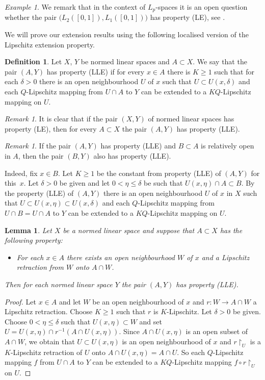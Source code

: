\documentclass[a4paper,twoside,10pt,reqno,draft]{amsart}
\let\comp=\circ
\let\wtilde=\widetilde
\newtheorem{lemma}[theorem]{Lemma}
\theoremstyle{definition}
\newtheorem{definition}[theorem]{Definition}
\theoremstyle{remark}
\newtheorem{remark}[theorem]{Remark}
\newtheorem{example}[theorem]{Example}
\newcommand\de{\delta}
\newcommand\restr[1]{\mathclose\restriction_{#1}}
\newcommand\pLLE{(LLE)}
\newcommand\pLE{(LE)}
\newcommand\pLLR{($\wtilde{\mathrm R}$)}
\begin{document}
\begin{example}
We remark that in the context of $L_p$-spaces it is an open question whether the pair $\bigl(L_2([0,1]),L_1([0,1])\bigr)$ has property \pLE, see \cite{NPSS}.
\end{example}

We will prove our extension results using the following localised version of the Lipschitz extension property.

\begin{definition}
Let $X$, $Y$ be normed linear spaces and $A\subset X$.
We say that the pair $(A,Y)$ has property {\pLLE} if for every $x\in A$ there is $K\ge1$ such that for each $\de>0$ there is an open neighbourhood $U$ of $x$ such that $U\subset U(x,\de)$
and each $Q$-Lipschitz mapping from $U\cap A$ to $Y$ can be extended to a $KQ$-Lipschitz mapping on $U$.
\end{definition}

\begin{remark}\label{r:LLE_prop}
It is clear that if the pair $(X,Y)$ of normed linear spaces has property {\pLE}, then for every $A\subset X$ the pair $(A,Y)$ has property \pLLE.
\end{remark}

\begin{remark}\label{r:LLE_subset}
If the pair $(A,Y)$ has property {\pLLE} and $B\subset A$ is relatively open in $A$, then the pair $(B,Y)$ also has property \pLLE.

Indeed, fix $x\in B$.
Let $K\ge1$ be the constant from property {\pLLE} of $(A,Y)$ for this~$x$.
Let $\de>0$ be given and let $0<\eta\le\de$ be such that $U(x,\eta)\cap A\subset B$.
By the property {\pLLE} of $(A,Y)$ there is an open neighbourhood $U$ of $x$ in $X$ such that $U\subset U(x,\eta)\subset U(x,\de)$
and each $Q$-Lipschitz mapping from $U\cap B=U\cap A$ to $Y$ can be extended to a $KQ$-Lipschitz mapping on $U$.
\end{remark}

\begin{lemma}\label{l:loc_ret}
Let $X$ be a normed linear space and suppose that $A\subset X$ has the following property:
\begin{itemize}
\item[\pLLR\ ]
For each $x\in A$ there exists an open neighbourhood $W$ of $x$ and a Lipschitz retraction from $W$ onto $A\cap W$.
\end{itemize}
Then for each normed linear space $Y$ the pair $(A,Y)$ has property {\pLLE}.
\end{lemma}
\begin{proof}
Let $x\in A$ and let $W$ be an open neighbourhood of $x$ and $r\colon W\to A\cap W$ a Lipschitz retraction.
Choose $K\ge1$ such that $r$ is $K$-Lipschitz.
Let $\de>0$ be given.
Choose $0<\eta\le\de$ such that $U(x,\eta)\subset W$ and set $U=U(x,\eta)\cap r^{-1}(A\cap U(x,\eta))$.
Since $A\cap U(x,\eta)$ is an open subset of $A\cap W$, we obtain that $U\subset U(x,\eta)$ is an open neighbourhood of $x$ and $r\restr U$ is a $K$-Lipschitz retraction of $U$ onto $A\cap U(x,\eta)=A\cap U$.
So each $Q$-Lipschitz mapping $f$ from $U\cap A$ to $Y$ can be extended to a $KQ$-Lipschitz mapping $f\comp r\restr U$ on $U$.
\end{proof}
\end{document}
